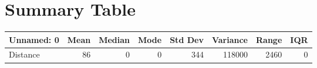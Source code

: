 \documentclass[a4paper,10pt]{article}
\begin{document}
        \section*{Summary Table}
        \begin{tabular}{lrrrrrrr}
\hline
 Unnamed: 0   &   Mean &   Median &   Mode &   Std Dev &   Variance &   Range &   IQR \\
\hline
 Distance     &     86 &        0 &      0 &       344 &     118000 &    2460 &     0 \\
\hline
\end{tabular}
        
\end{document}
